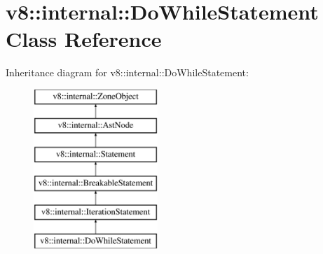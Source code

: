 \hypertarget{classv8_1_1internal_1_1_do_while_statement}{}\section{v8\+:\+:internal\+:\+:Do\+While\+Statement Class Reference}
\label{classv8_1_1internal_1_1_do_while_statement}
Inheritance diagram for v8\+:\+:internal\+:\+:Do\+While\+Statement\+:\begin{figure}[H]
\begin{center}
\leavevmode
\includegraphics[height=6.000000cm]{classv8_1_1internal_1_1_do_while_statement}
\end{center}
\end{figure}
